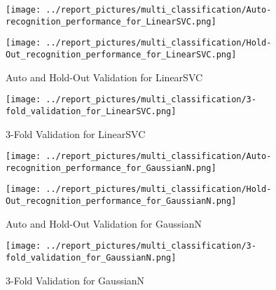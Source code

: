 
        \begin{figure}[H]
            \begin{minipage}[c]{.46\linewidth}
                  \texttt{[image: ../report\_pictures/multi\_classification/Auto-recognition\_performance\_for\_LinearSVC.png]}
            \end{minipage} \hfill
            \begin{minipage}[c]{.46\linewidth}
                \texttt{[image: ../report\_pictures/multi\_classification/Hold-Out\_recognition\_performance\_for\_LinearSVC.png]}
            \end{minipage}
            \caption{Auto and Hold-Out Validation for LinearSVC}
            \label{CV_LinearSVC}
        \end{figure}   
   
        \begin{figure}[H]
            \texttt{[image: ../report\_pictures/multi\_classification/3-fold\_validation\_for\_LinearSVC.png]}
        \caption{3-Fold Validation for LinearSVC}
        \label{3Fold_LinearSVC}
        \end{figure} 
        
        \begin{figure}[H]
            \begin{minipage}[c]{.46\linewidth}
                  \texttt{[image: ../report\_pictures/multi\_classification/Auto-recognition\_performance\_for\_GaussianN.png]}
            \end{minipage} \hfill
            \begin{minipage}[c]{.46\linewidth}
                \texttt{[image: ../report\_pictures/multi\_classification/Hold-Out\_recognition\_performance\_for\_GaussianN.png]}
            \end{minipage}
            \caption{Auto and Hold-Out Validation for GaussianN}
            \label{CV_GaussianN}
        \end{figure}   
   
        \begin{figure}[H]
            \texttt{[image: ../report\_pictures/multi\_classification/3-fold\_validation\_for\_GaussianN.png]}
        \caption{3-Fold Validation for GaussianN}
        \label{3Fold_GaussianN}
        \end{figure} 
        
